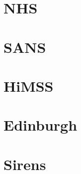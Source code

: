 \documentclass[phd,lfcs,notimes,openright]{infthesis}
\begin{document}
\section{NHS}

\section{SANS}

\section{HiMSS}

\section{Edinburgh}

\section{Sirens}




%
\singlespace


\end{document}
